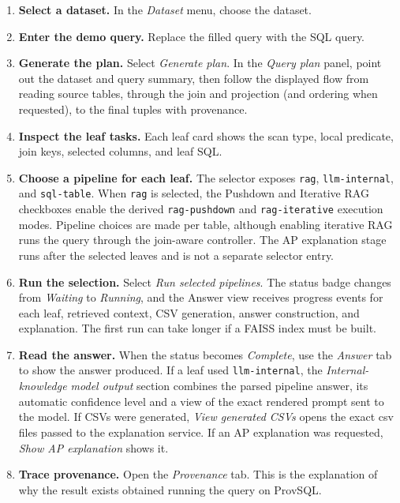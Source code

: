 \documentclass[11pt,a4paper]{article}
\newcommand{\code}[1]{\texttt{#1}}
\begin{document}
\begin{enumerate}
  \item \textbf{Select a dataset.} In the \textit{Dataset} menu, choose the dataset.

  \item \textbf{Enter the demo query.} Replace the filled query with the SQL
        query.

  \item \textbf{Generate the plan.} Select \textit{Generate plan}. In the
        \textit{Query plan} panel, point out the dataset and query summary, then
        follow the displayed flow from reading source tables,
        through the join and projection (and ordering when requested), to the final tuples with
        provenance.

  \item \textbf{Inspect the leaf tasks.} Each leaf card shows the
        scan type, local predicate, join keys, selected columns, and leaf SQL.

  \item \textbf{Choose a pipeline for each leaf.} The selector exposes
        \code{rag}, \code{llm-internal}, and \code{sql-table}. When
        \code{rag} is selected, the Pushdown and Iterative RAG checkboxes enable
        the derived \code{rag-pushdown} and \code{rag-iterative} execution
        modes. Pipeline choices are made per table, although enabling iterative
        RAG runs the query through the join-aware controller. The AP explanation
        stage runs after the selected leaves and is not a separate selector
        entry.

  \item \textbf{Run the selection.} Select \textit{Run selected pipelines}. The
        status badge changes from \textit{Waiting} to \textit{Running}, and the
        Answer view receives progress events for each leaf, retrieved context,
        CSV generation, answer construction, and explanation. The first run can
        take longer if a FAISS index must be built.

  \item \textbf{Read the answer.} When the status becomes \textit{Complete}, use
        the \textit{Answer} tab to show the answer produced.
        If a leaf used \code{llm-internal}, the
        \textit{Internal-knowledge model output} section combines the parsed
        pipeline answer, its automatic confidence level and a view of the exact rendered prompt sent to the model.
        If CSVs were generated, \textit{View generated CSVs} opens the exact
        csv files passed to the explanation service. If an AP explanation
        was requested, \textit{Show AP explanation} shows it.

  \item \textbf{Trace provenance.} Open the \textit{Provenance} tab. This is the
      explanation of why the result exists obtained running the query on ProvSQL.

\end{enumerate}
\end{document}
